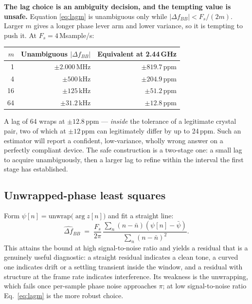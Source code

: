 \documentclass[11pt,a4paper]{article}
\begin{document}
\begin{caution}
\textbf{The lag choice is an ambiguity decision, and the tempting value is unsafe.} Equation
\eqref{eq:lagm} is unambiguous only while $|\Delta f_{BB}| < F_s/(2m)$. Larger $m$ gives a longer
phase lever arm and lower variance, so it is tempting to push it. At $F_s = 4$\,Msample/s:
\begin{center}\small
\begin{tabular}{@{}rrr@{}}
\toprule
$m$ & Unambiguous $|\Delta f_{BB}|$ & Equivalent at 2.44\,GHz \\
\midrule
1  & $\pm 2.000$\,MHz  & $\pm 819.7$\,ppm \\
4  & $\pm 500$\,kHz    & $\pm 204.9$\,ppm \\
16 & $\pm 125$\,kHz    & $\pm 51.2$\,ppm \\
64 & $\pm 31.2$\,kHz   & $\pm 12.8$\,ppm \\
\bottomrule
\end{tabular}
\end{center}
A lag of 64 wraps at $\pm12.8$\,ppm --- \emph{inside} the tolerance of a legitimate crystal pair, two
of which at $\pm 12$\,ppm can legitimately differ by up to 24\,ppm. Such an estimator will report a
confident, low-variance, wholly wrong answer on a perfectly compliant device. The safe construction is
a two-stage one: a small lag to acquire unambiguously, then a larger lag to refine within the interval
the first stage has established.
\end{caution}

\subsection{Unwrapped-phase least squares}

Form $\psi[n] = \mathrm{unwrap}\bigl(\arg z[n]\bigr)$ and fit a straight line:
\begin{equation}
\widehat{\Delta f}_{BB} \;=\; \frac{F_s}{2\pi}\,
\frac{\sum_n (n-\bar n)(\psi[n]-\bar\psi)}{\sum_n (n-\bar n)^2}.
\label{eq:phasels}
\end{equation}
This attains the bound at high signal-to-noise ratio and yields a residual that is a genuinely useful
diagnostic: a straight residual indicates a clean tone, a curved one indicates drift or a settling
transient inside the window, and a residual with structure at the frame rate indicates interference.
Its weakness is the unwrapping, which fails once per-sample phase noise approaches $\pi$; at low
signal-to-noise ratio Eq.~\eqref{eq:lagm} is the more robust choice.
\end{document}
